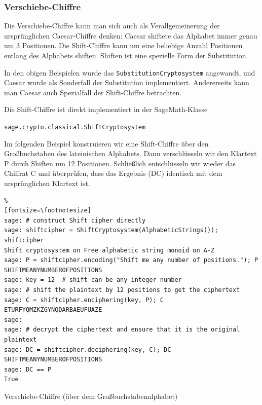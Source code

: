 \begin{refsegment}
\newpage
\subsubsection{Verschiebe-Chiffre}

Die Verschiebe-Chiffre kann man sich auch als Verallgemeinerung der ursprünglichen
Caesar-Chiffre denken: Caesar shiftete das Alphabet immer genau um 3 Positionen.
Die Shift-Chiffre kann um eine beliebige Anzahl Positionen entlang des
Alphabets shiften. Shiften ist eine spezielle Form der Substitution.

In den obigen Beispielen wurde das \verb!SubstitutionCryptosystem! angewandt, und
Caesar wurde als Sonderfall der Substitution implementiert. Andererseits
kann man Caesar auch Spezialfall der Shift-Chiffre betrachten.

Die Shift-Chiffre  ist direkt implementiert in der SageMath-Klasse
\begin{center}
\verb!sage.crypto.classical.ShiftCryptosystem!
\end{center}

Im folgenden Beispiel konstruieren wir eine Shift-Chiffre über den Großbuchstaben
des lateinischen Alphabets. Dann verschlüsseln wir den Klartext P durch Shiften
um 12 Positionen. Schließlich entschlüsseln wir wieder das Chiffrat C und überprüfen,
dass das Ergebnis (DC) identisch mit dem ursprünglichen Klartext ist.

\begin{sagecode}
\begin{Verbatim}%
[fontsize=\footnotesize]
sage: # construct Shift cipher directly
sage: shiftcipher = ShiftCryptosystem(AlphabeticStrings()); shiftcipher
Shift cryptosystem on Free alphabetic string monoid on A-Z
sage: P = shiftcipher.encoding("Shift me any number of positions."); P
SHIFTMEANYNUMBEROFPOSITIONS
sage: key = 12  # shift can be any integer number
sage: # shift the plaintext by 12 positions to get the ciphertext
sage: C = shiftcipher.enciphering(key, P); C
ETURFYQMZKZGYNQDARBAEUFUAZE
sage:
sage: # decrypt the ciphertext and ensure that it is the original plaintext
sage: DC = shiftcipher.deciphering(key, C); DC
SHIFTMEANYNUMBEROFPOSITIONS
sage: DC == P
True
\end{Verbatim}
\caption{Verschiebe-Chiffre (über dem Großbuchstabenalphabet)}
\label{paper_pencil:shift_cipher:Sage_example}
\end{sagecode}


\end{refsegment}
